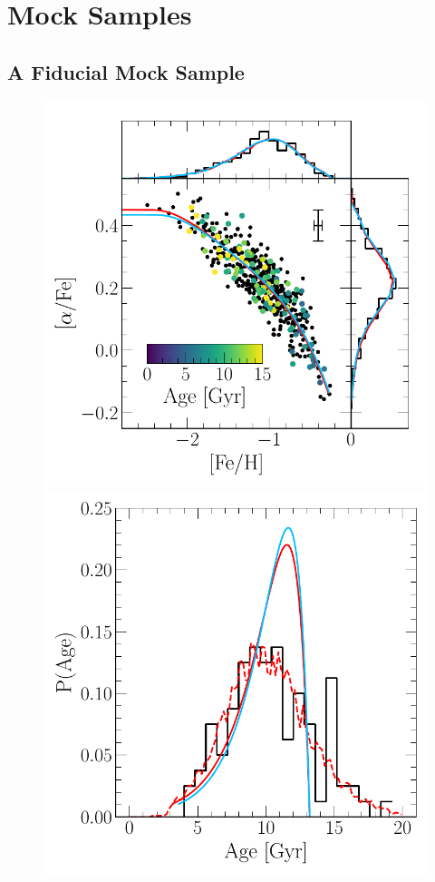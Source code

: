 \documentclass[ms.tex]{subfiles}
\begin{document}
\section{Mock Samples}
\label{sec:mocks}

\subsection{A Fiducial Mock Sample}
\label{sec:mocks:fiducial}

\begin{figure}
\centering
\includegraphics[scale = 0.5]{fiducial_mock_afe_feh.pdf}
\includegraphics[scale = 0.42]{fiducial_mock_agedist.pdf}

\end{figure}
\end{document}
